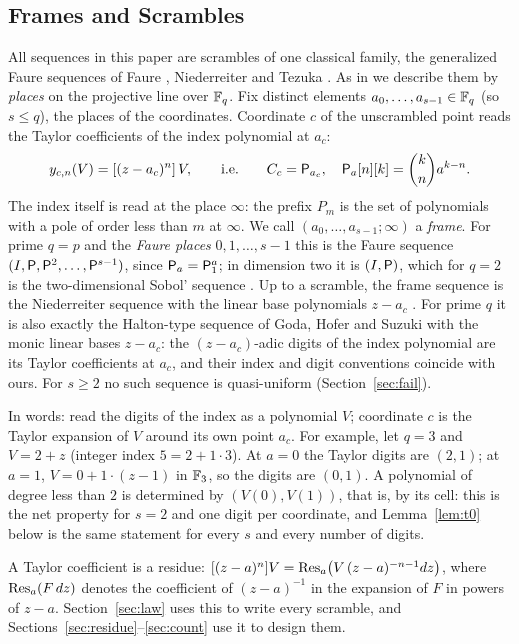 \subsection{Frames and Scrambles}
All sequences in this paper are scrambles of one classical family, the generalized Faure sequences of Faure \cite{Fau82}, Niederreiter \cite{Nie87} and Tezuka \cite{Tez93,Tez95}. As in \cite{Gru26geo} we describe them by \emph{places} on the projective line over $\mathbb{F}_q$. Fix distinct elements $a_0,\dots,a_{s-1}\in\mathbb{F}_q$ (so $s\le q$), the places of the coordinates. Coordinate $c$ of the unscrambled point reads the Taylor coefficients of the index polynomial at $a_c$:
\[
y_{c,n}(V)=[(z-a_c)^n]\,V,\qquad\text{i.e.}\qquad C_c=\mathsf{P}_{a_c},\quad \mathsf{P}_a[n][k]=\binom kn a^{k-n}.
\]
The index itself is read at the place $\infty$: the prefix $P_m$ is the set of polynomials with a pole of order less than $m$ at $\infty$. We call $(a_0,\dots,a_{s-1};\infty)$ a \emph{frame}. For prime $q=p$ and the \emph{Faure places} $0,1,\dots,s-1$ this is the Faure sequence $(I,\mathsf{P},\mathsf{P}^2,\dots,\mathsf{P}^{s-1})$, since $\mathsf{P}_a=\mathsf{P}_1^a$; in dimension two it is $(I,\mathsf{P})$, which for $q=2$ is the two-dimensional Sobol' sequence \cite{Sob67}. Up to a scramble, the frame sequence is the Niederreiter sequence with the linear base polynomials $z-a_c$ \cite{Nie87}. For prime $q$ it is also exactly the Halton-type sequence of Goda, Hofer and Suzuki \cite[Def.~2]{GHS26} with the monic linear bases $z-a_c$: the $(z-a_c)$-adic digits of the index polynomial are its Taylor coefficients at $a_c$, and their index and digit conventions coincide with ours. For $s\ge2$ no such sequence is quasi-uniform (Section~\ref{sec:fail}).

In words: read the digits of the index as a polynomial $V$; coordinate $c$ is the Taylor expansion of $V$ around its own point $a_c$. For example, let $q=3$ and $V=2+z$ (integer index $5=2+1\cdot3$). At $a=0$ the Taylor digits are $(2,1)$; at $a=1$, $V=0+1\cdot(z-1)$ in $\mathbb{F}_3$, so the digits are $(0,1)$. A polynomial of degree less than $2$ is determined by $(V(0),V(1))$, that is, by its cell: this is the net property for $s=2$ and one digit per coordinate, and Lemma~\ref{lem:t0} below is the same statement for every $s$ and every number of digits.

A Taylor coefficient is a residue: $[(z-a)^n]V=\operatorname{Res}_a\bigl(V\,(z-a)^{-n-1}dz\bigr)$, where $\operatorname{Res}_a(F\,dz)$ denotes the coefficient of $(z-a)^{-1}$ in the expansion of $F$ in powers of $z-a$. Section~\ref{sec:law} uses this to write every scramble, and Sections~\ref{sec:residue}--\ref{sec:count} use it to design them.

